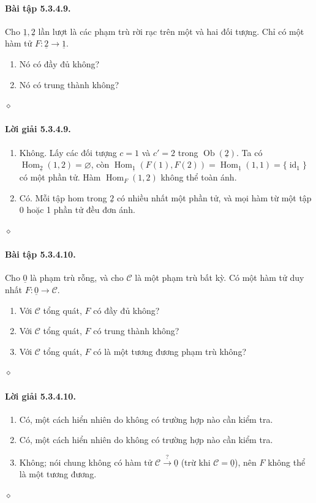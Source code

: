 \paragraph{Bài tập 5.3.4.9.} Cho $\underline{1},\underline{2}$ lần lượt là các phạm trù rời rạc trên một và hai đối tượng. Chỉ có một hàm tử $F:\underline{2}\to\underline{1}$.
\begin{enumerate}[label=\alph*.]\item Nó có đầy đủ không?\item Nó có trung thành không?\end{enumerate}\hfill$\diamond$
\paragraph{Lời giải 5.3.4.9.}
\begin{enumerate}[label=\alph*.]
\item Không. Lấy các đối tượng $c=1$ và $c'=2$ trong $\operatorname{Ob}(\underline{2})$. Ta có $\operatorname{Hom}_{\underline{2}}(1,2)=\varnothing$, còn $\operatorname{Hom}_{\underline{1}}(F(1),F(2))=\operatorname{Hom}_{\underline{1}}(1,1)=\{\operatorname{id}_1\}$ có một phần tử. Hàm $\operatorname{Hom}_F(1,2)$ không thể toàn ánh.
\item Có. Mỗi tập hom trong $\underline{2}$ có nhiều nhất một phần tử, và mọi hàm từ một tập 0 hoặc 1 phần tử đều đơn ánh.
\end{enumerate}\hfill$\diamond$
\paragraph{Bài tập 5.3.4.10.} Cho $\underline{0}$ là phạm trù rỗng, và cho $\mathcal C$ là một phạm trù bất kỳ. Có một hàm tử duy nhất $F:\underline{0}\to\mathcal C$.
\begin{enumerate}[label=\alph*.]\item Với $\mathcal C$ tổng quát, $F$ có đầy đủ không?\item Với $\mathcal C$ tổng quát, $F$ có trung thành không?\item Với $\mathcal C$ tổng quát, $F$ có là một tương đương phạm trù không?\end{enumerate}\hfill$\diamond$
\paragraph{Lời giải 5.3.4.10.}
\begin{enumerate}[label=\alph*.]\item Có, một cách hiển nhiên do không có trường hợp nào cần kiểm tra.\item Có, một cách hiển nhiên do không có trường hợp nào cần kiểm tra.\item Không; nói chung không có hàm tử $\mathcal C\xrightarrow{?}\underline{0}$ (trừ khi $\mathcal C=\underline{0}$), nên $F$ không thể là một tương đương.\end{enumerate}\hfill$\diamond$
